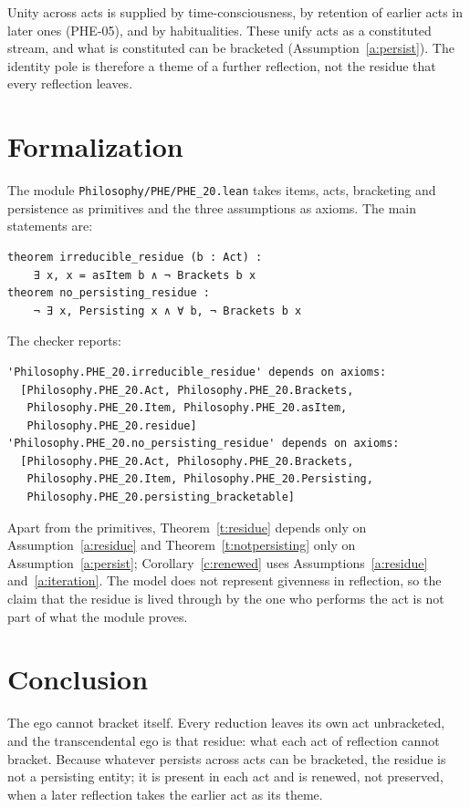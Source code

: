\documentclass{situationist-preprint}
\begin{document}
\begin{reply}
Unity across acts is supplied by time-consciousness, by retention of earlier acts in later ones (PHE-05), and by habitualities. These unify acts as a constituted stream, and what is constituted can be bracketed (Assumption~\ref{a:persist}). The identity pole is therefore a theme of a further reflection, not the residue that every reflection leaves.
\end{reply}

\section{Formalization}

The module \nolinkurl{Philosophy/PHE/PHE_20.lean} takes items, acts, bracketing and persistence as primitives and the three assumptions as axioms. The main statements are:

\begin{lstlisting}
theorem irreducible_residue (b : Act) :
    ∃ x, x = asItem b ∧ ¬ Brackets b x
theorem no_persisting_residue :
    ¬ ∃ x, Persisting x ∧ ∀ b, ¬ Brackets b x
\end{lstlisting}

\noindent The checker reports:

\begin{lstlisting}
'Philosophy.PHE_20.irreducible_residue' depends on axioms:
  [Philosophy.PHE_20.Act, Philosophy.PHE_20.Brackets,
   Philosophy.PHE_20.Item, Philosophy.PHE_20.asItem,
   Philosophy.PHE_20.residue]
'Philosophy.PHE_20.no_persisting_residue' depends on axioms:
  [Philosophy.PHE_20.Act, Philosophy.PHE_20.Brackets,
   Philosophy.PHE_20.Item, Philosophy.PHE_20.Persisting,
   Philosophy.PHE_20.persisting_bracketable]
\end{lstlisting}

\noindent Apart from the primitives, Theorem~\ref{t:residue} depends only on Assumption~\ref{a:residue} and Theorem~\ref{t:notpersisting} only on Assumption~\ref{a:persist}; Corollary~\ref{c:renewed} uses Assumptions~\ref{a:residue} and~\ref{a:iteration}. The model does not represent givenness in reflection, so the claim that the residue is lived through by the one who performs the act is not part of what the module proves.

\section{Conclusion}

The ego cannot bracket itself. Every reduction leaves its own act unbracketed, and the transcendental ego is that residue: what each act of reflection cannot bracket. Because whatever persists across acts can be bracketed, the residue is not a persisting entity; it is present in each act and is renewed, not preserved, when a later reflection takes the earlier act as its theme.
\end{document}
